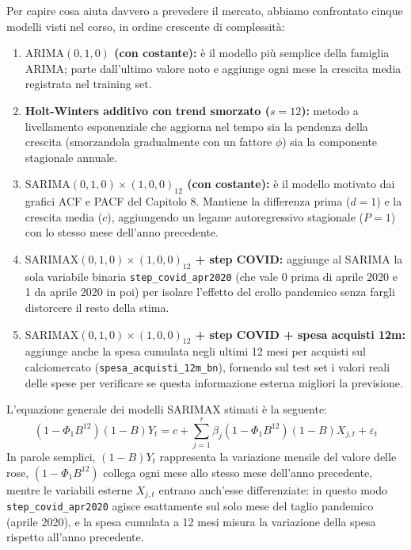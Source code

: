 Per capire cosa aiuta davvero a prevedere il mercato, abbiamo confrontato cinque modelli visti nel corso, in ordine crescente di complessità:
\begin{enumerate}
    \item \textbf{$\mathrm{ARIMA}(0, 1, 0)$ (con costante):} è il modello più semplice della famiglia ARIMA; parte dall'ultimo valore noto e aggiunge ogni mese la crescita media registrata nel training set.
    \item \textbf{Holt-Winters additivo con trend smorzato ($s = 12$):} metodo a livellamento esponenziale che aggiorna nel tempo sia la pendenza della crescita (smorzandola gradualmente con un fattore $\phi$) sia la componente stagionale annuale.
    \item \textbf{$\mathrm{SARIMA}(0, 1, 0) \times (1, 0, 0)_{12}$ (con costante):} è il modello motivato dai grafici ACF e PACF del Capitolo 8. Mantiene la differenza prima ($d = 1$) e la crescita media ($c$), aggiungendo un legame autoregressivo stagionale ($P = 1$) con lo stesso mese dell'anno precedente.
    \item \textbf{$\mathrm{SARIMAX}(0, 1, 0) \times (1, 0, 0)_{12}$ + step COVID:} aggiunge al SARIMA la sola variabile binaria \texttt{step\_\allowbreak covid\_\allowbreak apr2020} (che vale 0 prima di aprile 2020 e 1 da aprile 2020 in poi) per isolare l'effetto del crollo pandemico senza fargli distorcere il resto della stima.
    \item \textbf{$\mathrm{SARIMAX}(0, 1, 0) \times (1, 0, 0)_{12}$ + step COVID + spesa acquisti 12m:} aggiunge anche la spesa cumulata negli ultimi 12 mesi per acquisti sul calciomercato (\texttt{spesa\_\allowbreak acquisti\_\allowbreak 12m\_\allowbreak bn}), fornendo sul test set i valori reali delle spese per verificare se questa informazione esterna migliori la previsione.
\end{enumerate}

L'equazione generale dei modelli SARIMAX stimati è la seguente:
\begin{equation}
    (1 - \Phi_1 B^{12})(1 - B) Y_t = c + \sum_{j=1}^{r} \beta_j (1 - \Phi_1 B^{12})(1 - B) X_{j,t} + \varepsilon_t
\label{eq:modello_sarimax}
\end{equation}
In parole semplici, $(1 - B)Y_t$ rappresenta la variazione mensile del valore delle rose, $(1 - \Phi_1 B^{12})$ collega ogni mese allo stesso mese dell'anno precedente, mentre le variabili esterne $X_{j,t}$ entrano anch'esse differenziate: in questo modo \texttt{step\_covid\_apr2020} agisce esattamente sul solo mese del taglio pandemico (aprile 2020), e la spesa cumulata a 12 mesi misura la variazione della spesa rispetto all'anno precedente.

